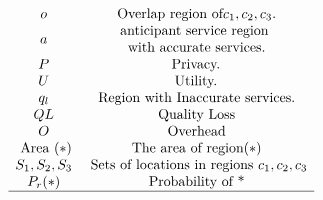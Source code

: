 \documentclass[a4paper,fleqn]{cas-dc}
\begin{document}
\[\begin{aligned}
\begin{aligned}
\begin{array}{cc}
            o & \text {Overlap region of} c_1, c_2, c_3.\\
            
            a &  \begin{array}{c}
                \text{anticipant service region }  \\ \text{with accurate services.}
            \end{array} \\
            
            P &\text { Privacy. } \\
            
            U & \text { Utility. } \\
            q_l & \text{Region with Inaccurate services.} \\ 
            
            QL & \text{Quality Loss} \\ 
            O & \text{Overhead} \\
            
            \text { Area }(*) &  \text{The area of region} (*) \\
            
            S_{1}, S_{2}, S_{3} & \text { Sets of locations in regions } c_{1}, c_{2}, c_{3} \\
            
            P_{r}(*) & \text { Probability of * } \\
        \hline
    \end{array}
\end{aligned}
\end{aligned}
\]
\end{document}
